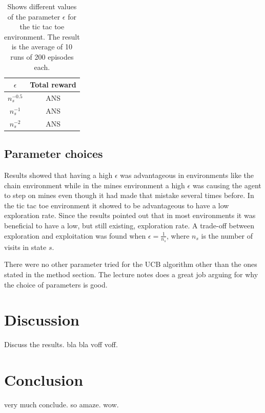 \documentclass[11pt]{article}
\numberwithin{equation}{section}
\begin{document}
\begin{flushleft}
\begin{table}[H]
\caption{Shows different values of the parameter $\epsilon$ for the tic tac toe environment. The result is the average of 10 runs of 200 episodes each.}
\begin{center}
\begin{tabular}{|c|c|}
\hline
$\epsilon$ & Total reward \\ \hline
$n_s^{-0.5}$ & ANS \\ \hline
$n_s^{-1}$ & ANS \\ \hline
$n_s^{-2}$ & ANS \\
\hline
\end{tabular}
\label{tab:tttMean}
\end{center}
\end{table}

\subsection{Parameter choices}

Results showed that having a high $\epsilon$ was advantageous in environments like the chain environment while in the mines environment a high $\epsilon$ was causing the agent to step on mines even though it had made that mistake several times before. In the tic tac toe environment it showed to be advantageous to have a low exploration rate. Since the results pointed out that in most environments it was beneficial to have a low, but still existing, exploration rate. A trade-off between exploration and exploitation was found when $\epsilon = \frac{1}{n_s}$, where $n_s$ is the number of visits in state $s$. \newline

There were no other parameter tried for the UCB algorithm other than the ones stated in the method section. The lecture notes does a great job arguing for why the choice of parameters is good.

\section{Discussion}

Discuss the results. bla bla voff voff.

\section{Conclusion}

very much conclude. so amaze. wow.

\end{flushleft}
\end{document}
